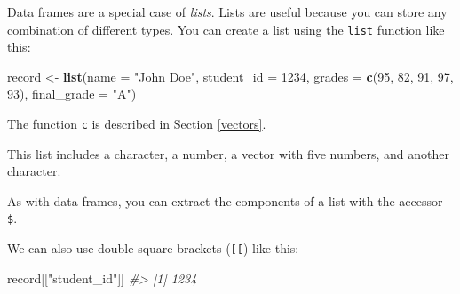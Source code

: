 \documentclass[
]{krantz}
\newenvironment{Shaded}{\begin{snugshade}}{\end{snugshade}}
\newcommand{\CommentTok}[1]{\textcolor[rgb]{0.37,0.37,0.37}{\textit{#1}}}
\newcommand{\DataTypeTok}[1]{\textcolor[rgb]{0.27,0.27,0.27}{#1}}
\newcommand{\DecValTok}[1]{\textcolor[rgb]{0.06,0.06,0.06}{#1}}
\newcommand{\KeywordTok}[1]{\textcolor[rgb]{0.27,0.27,0.27}{\textbf{#1}}}
\newcommand{\NormalTok}[1]{#1}
\newcommand{\OperatorTok}[1]{\textcolor[rgb]{0.43,0.43,0.43}{\textbf{#1}}}
\newcommand{\StringTok}[1]{\textcolor[rgb]{0.5,0.5,0.5}{#1}}
\begin{document}
Data frames are a special case of \emph{lists}. Lists are useful because you can store any combination of different types. You can create a list using the \texttt{list} function like this:

\begin{Shaded}
\begin{Highlighting}[]
\NormalTok{record <-}\StringTok{ }\KeywordTok{list}\NormalTok{(}\DataTypeTok{name =} \StringTok{"John Doe"}\NormalTok{,}
             \DataTypeTok{student_id =} \DecValTok{1234}\NormalTok{,}
             \DataTypeTok{grades =} \KeywordTok{c}\NormalTok{(}\DecValTok{95}\NormalTok{, }\DecValTok{82}\NormalTok{, }\DecValTok{91}\NormalTok{, }\DecValTok{97}\NormalTok{, }\DecValTok{93}\NormalTok{),}
             \DataTypeTok{final_grade =} \StringTok{"A"}\NormalTok{)}
\end{Highlighting}
\end{Shaded}

The function \texttt{c} is described in Section \ref{vectors}.

This list includes a character, a number, a vector with five numbers, and another character.

\begin{Shaded}
\end{Shaded}

As with data frames, you can extract the components of a list with the accessor \texttt{\$}.

\begin{Shaded}
\end{Shaded}

We can also use double square brackets (\texttt{{[}{[}}) like this:

\begin{Shaded}
\begin{Highlighting}[]
\NormalTok{record[[}\StringTok{"student_id"}\NormalTok{]]}
\CommentTok{#> [1] 1234}
\end{Highlighting}
\end{Shaded}
\end{document}
